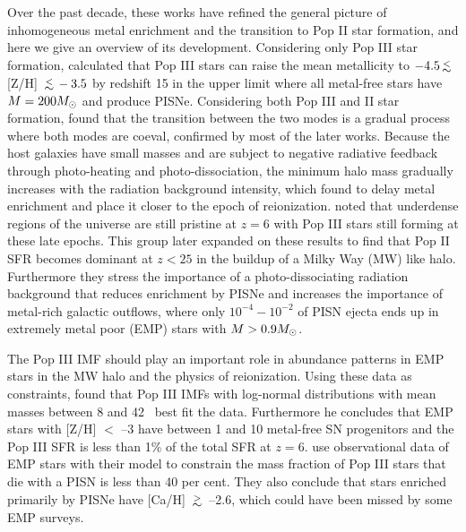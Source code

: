 \documentclass[12pt,preprint]{aastex}
\begin{document}
Over the past decade, these works have refined the general picture of
inhomogeneous metal enrichment and the transition to Pop II star
formation, and here we give an overview of its development.
Considering only Pop III star formation, \citeauthor{Yoshida04}
calculated that Pop III stars can raise the mean metallicity to $-4.5
\lsim$ [Z/H] $\lsim -3.5$ by redshift 15 in the upper limit where all
metal-free stars have $M = 200 \Ms$ and produce PISNe.  Considering
both Pop III and II star formation, \citeauthor{Scannapieco03} found
that the transition between the two modes is a gradual process where
both modes are coeval, confirmed by most of the later works.  Because
the host galaxies have small masses and are subject to negative
radiative feedback through photo-heating and photo-dissociation, the
minimum halo mass gradually increases with the radiation background
intensity, which \citeauthor{Furlanetto05_Reion} found to delay metal
enrichment and place it closer to the epoch of reionization.
\citeauthor{Trenti09} noted that underdense regions of the universe
are still pristine at $z=6$ with Pop III stars still forming at these
late epochs.  This group later expanded on these results to find that
Pop II SFR becomes dominant at $z<25$ in the buildup of a Milky Way
(MW) like halo.  Furthermore they stress the importance of a
photo-dissociating radiation background that reduces enrichment by
PISNe and increases the importance of metal-rich galactic outflows,
where only $10^{-4} - 10^{-2}$ of PISN ejecta ends up in extremely
metal poor (EMP) stars with $M > 0.9 \Ms$.

The Pop III IMF should play an important role in abundance patterns in
EMP stars in the MW halo and the physics of reionization.  Using these
data as constraints, \citeauthor{Tumlinson06} found that Pop III IMFs
with log-normal distributions with mean masses between 8 and 42
\Ms~best fit the data.  Furthermore he concludes that EMP stars with
[Z/H] $<$ --3 have between 1 and 10 metal-free SN progenitors and
the Pop III SFR is less than 1\% of the total SFR at $z=6$.
\citeauthor{Karlsson08} use observational data of EMP stars with
their model to constrain the mass fraction of Pop III stars that
die with a PISN is less than 40 per cent.  They also conclude that
stars enriched primarily by PISNe have [Ca/H] $\gsim$ --2.6, which
could have been missed by some EMP surveys.
\end{document}
